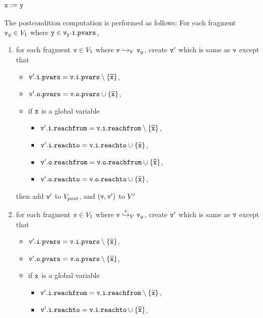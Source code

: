 \subsubsection{${\tt x := y}$}
The postcondition computation is performed as follows:
For each fragment $\mathtt{v}_y \in V_1$ where $\tt y \in\mathtt{v}_y.\mathtt{i}.\mathtt{pvars}$, 
\begin{enumerate}
\item  for each fragment $\mathtt{v} \in V_1$ where $\mathtt{v} \hookrightarrow_{V} \mathtt{v}_y$, create $\mathtt{v}'$ which is same as $\mathtt{v}$ except that
\begin{itemize}
\item $\mathtt{v}'.\mathtt{i}.\mathtt{pvars} = \mathtt{v}.\mathtt{i}.\mathtt{pvars} \setminus \left\{\widehat{\mathtt{x}}\right\}$,
\item $\mathtt{v}'.\mathtt{o}.\mathtt{pvars} = \mathtt{v}.\mathtt{o}.\mathtt{pvars} \cup \left\{\widehat{\mathtt{x}}\right\}$,
\item if $\mathtt{x}$ is a global variable
\begin{itemize}
\item $\mathtt{v}'.\mathtt{i}.\mathtt{reachfrom} = \mathtt{v}.\mathtt{i}.\mathtt{reachfrom} \setminus \left\{\widehat{\mathtt{x}}\right\}$,
\item $\mathtt{v}'.\mathtt{i}.\mathtt{reachto} = \mathtt{v}.\mathtt{i}.\mathtt{reachto} \cup \left\{\widehat{\mathtt{x}}\right\}$,
 \item $\mathtt{v}'.\mathtt{o}.\mathtt{reachfrom} = \mathtt{v}.\mathtt{o}.\mathtt{reachfrom} \cup \left\{\widehat{\mathtt{x}}\right\}$,
\item $\mathtt{v}'.\mathtt{o}.\mathtt{reachto} = \mathtt{v}.\mathtt{o}.\mathtt{reachto} \cup \left\{\widehat{\mathtt{x}}\right\}$,
\end{itemize}
\end{itemize}
then add $\mathtt{v}'$ to $V_{post}$, and $(\mathtt{v},\mathtt{v}')$ to $V'$
\item for each fragment $\mathtt{v} \in V_1$ where $\mathtt{v} \overset{+}\hookrightarrow_{V} \mathtt{v}_y$, create $\mathtt{v}'$ which is same as $\mathtt{v}$ except that
\begin{itemize}
\item $\mathtt{v}'.\mathtt{i}.\mathtt{pvars} = \mathtt{v}.\mathtt{i}.\mathtt{pvars} \setminus \left\{\widehat{\mathtt{x}}\right\}$,
\item $\mathtt{v}'.\mathtt{o}.\mathtt{pvars} = \mathtt{v}.\mathtt{o}.\mathtt{pvars} \setminus \left\{\widehat{\mathtt{x}}\right\}$,
\item if $\mathtt{x}$ is a global variable
\begin{itemize}
\item $\mathtt{v}'.\mathtt{i}.\mathtt{reachfrom} = \mathtt{v}.\mathtt{i}.\mathtt{reachfrom} \setminus \left\{\widehat{\mathtt{x}}\right\}$,
\item $\mathtt{v}'.\mathtt{i}.\mathtt{reachto} = \mathtt{v}.\mathtt{i}.\mathtt{reachto} \cup \left\{\widehat{\mathtt{x}}\right\}$,

\end{itemize}
\end{itemize}
\end{enumerate}
